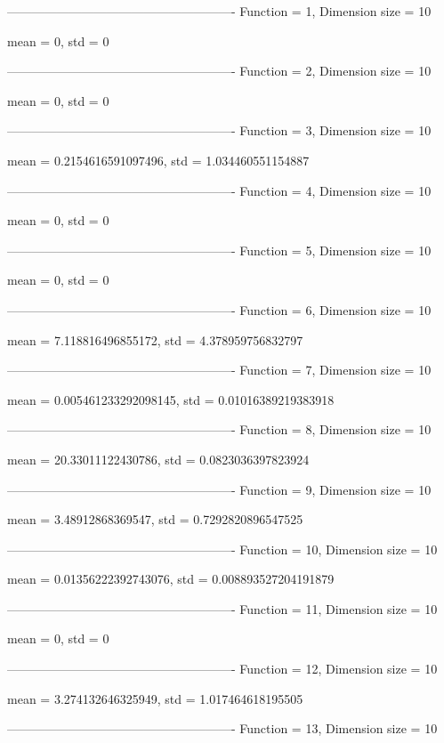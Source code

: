 -------------------------------------------------------
Function = 1, Dimension size = 10


mean = 0, std = 0

-------------------------------------------------------
Function = 2, Dimension size = 10


mean = 0, std = 0

-------------------------------------------------------
Function = 3, Dimension size = 10


mean = 0.2154616591097496, std = 1.034460551154887

-------------------------------------------------------
Function = 4, Dimension size = 10


mean = 0, std = 0

-------------------------------------------------------
Function = 5, Dimension size = 10


mean = 0, std = 0

-------------------------------------------------------
Function = 6, Dimension size = 10


mean = 7.118816496855172, std = 4.378959756832797

-------------------------------------------------------
Function = 7, Dimension size = 10


mean = 0.005461233292098145, std = 0.01016389219383918

-------------------------------------------------------
Function = 8, Dimension size = 10


mean = 20.33011122430786, std = 0.0823036397823924

-------------------------------------------------------
Function = 9, Dimension size = 10


mean = 3.48912868369547, std = 0.7292820896547525

-------------------------------------------------------
Function = 10, Dimension size = 10


mean = 0.01356222392743076, std = 0.008893527204191879

-------------------------------------------------------
Function = 11, Dimension size = 10


mean = 0, std = 0

-------------------------------------------------------
Function = 12, Dimension size = 10


mean = 3.274132646325949, std = 1.017464618195505

-------------------------------------------------------
Function = 13, Dimension size = 10


